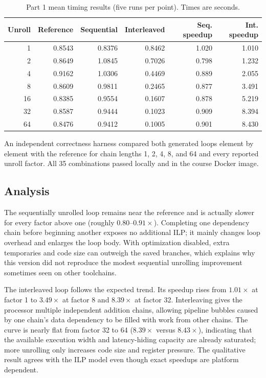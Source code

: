 \documentclass[11pt]{article}
\begin{document}
\begin{table}[H]
    \centering
    \caption{Part 1 mean timing results (five runs per point). Times are seconds.}
    \label{tab:part1-results}
    \small
    \begin{tabular}{rrrrrr}
        \toprule
        Unroll & Reference & Sequential & Interleaved & Seq. speedup & Int. speedup\\
        \midrule
        1  & 0.8543 & 0.8376 & 0.8462 & 1.020 & 1.010\\
        2  & 0.8649 & 1.0845 & 0.7026 & 0.798 & 1.232\\
        4  & 0.9162 & 1.0306 & 0.4469 & 0.889 & 2.055\\
        8  & 0.8609 & 0.9811 & 0.2465 & 0.877 & 3.491\\
        16 & 0.8385 & 0.9554 & 0.1607 & 0.878 & 5.219\\
        32 & 0.8587 & 0.9444 & 0.1023 & 0.909 & 8.394\\
        64 & 0.8476 & 0.9412 & 0.1005 & 0.901 & 8.430\\
        \bottomrule
    \end{tabular}
\end{table}

An independent correctness harness compared both generated loops element by
element with the reference for chain lengths 1, 2, 4, 8, and 64 and every
reported unroll factor.  All 35 combinations passed locally and in the course
Docker image.

\subsection{Analysis}

The sequentially unrolled loop remains near the reference and is actually
slower for every factor above one (roughly $0.80$--$0.91\times$).  Completing
one dependency chain before beginning another exposes no additional ILP; it
mainly changes loop overhead and enlarges the loop body.  With optimization
disabled, extra temporaries and code size can outweigh the saved branches,
which explains why this version did not reproduce the modest sequential
unrolling improvement sometimes seen on other toolchains.

The interleaved loop follows the expected trend.  Its speedup rises from
$1.01\times$ at factor 1 to $3.49\times$ at factor 8 and $8.39\times$ at
factor 32.  Interleaving gives the processor multiple independent addition
chains, allowing pipeline bubbles caused by one chain's data dependency to be
filled with work from other chains.  The curve is nearly flat from factor 32
to 64 ($8.39\times$ versus $8.43\times$), indicating that the available
execution width and latency-hiding capacity are already saturated; more
unrolling only increases code size and register pressure.  The qualitative
result agrees with the ILP model even though exact speedups are platform
dependent.
\end{document}
